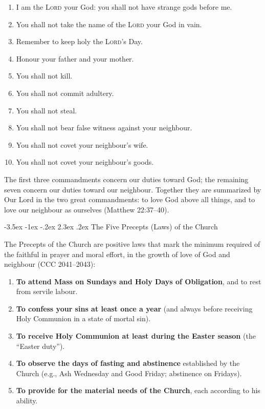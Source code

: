 \documentclass[11pt]{article}
\makeatletter
\renewcommand\section{\@startsection{section}{1}{\z@}%
  {-3.5ex \@plus -1ex \@minus -.2ex}%
  {2.3ex \@plus.2ex}%
  {\normalfont\Large\bfseries\color{churchblue}}}
\makeatother
\begin{document}
\begin{enumerate}
  \item I am the \textsc{Lord} your God: you shall not have strange gods before me.
  \item You shall not take the name of the \textsc{Lord} your God in vain.
  \item Remember to keep holy the \textsc{Lord}'s Day.
  \item Honour your father and your mother.
  \item You shall not kill.
  \item You shall not commit adultery.
  \item You shall not steal.
  \item You shall not bear false witness against your neighbour.
  \item You shall not covet your neighbour's wife.
  \item You shall not covet your neighbour's goods.
\end{enumerate}

The first three commandments concern our duties toward God; the
remaining seven concern our duties toward our neighbour. Together they
are summarized by Our Lord in the two great commandments: to love God
above all things, and to love our neighbour as ourselves
(Matthew 22:37--40).

\section{The Five Precepts (Laws) of the Church}

The Precepts of the Church are positive laws that mark the minimum
required of the faithful in prayer and moral effort, in the growth of
love of God and neighbour (CCC 2041--2043):

\begin{enumerate}
  \item \textbf{To attend Mass on Sundays and Holy Days of Obligation}, and to rest from servile labour.
  \item \textbf{To confess your sins at least once a year} (and always before receiving Holy Communion in a state of mortal sin).
  \item \textbf{To receive Holy Communion at least during the Easter season} (the ``Easter duty'').
  \item \textbf{To observe the days of fasting and abstinence} established by the Church (e.g., Ash Wednesday and Good Friday; abstinence on Fridays).
  \item \textbf{To provide for the material needs of the Church}, each according to his ability.
\end{enumerate}
\end{document}
